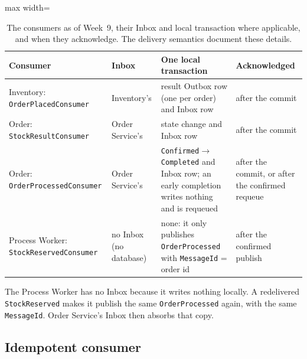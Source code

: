 \documentclass[a4paper]{report}
\begin{document}
\begin{table}[tbp]
\centering
\small
\begin{adjustbox}{max width=\linewidth}
\begin{tabular}{@{}>{\raggedright\arraybackslash}p{3.9cm}>{\raggedright\arraybackslash}p{2.2cm}>{\raggedright\arraybackslash}p{4.4cm}>{\raggedright\arraybackslash}p{3.1cm}@{}}
\toprule
Consumer & Inbox & One local transaction & Acknowledged \\
\midrule
Inventory: \texttt{OrderPlaced}\allowbreak\texttt{Consumer} & Inventory's & result Outbox row (one per order) and Inbox row & after the commit \\
Order: \texttt{StockResult}\allowbreak\texttt{Consumer} & Order Service's & state change and Inbox row & after the commit \\
Order: \texttt{OrderProcessed}\allowbreak\texttt{Consumer} & Order Service's & \texttt{Confirmed}$\to$\texttt{Completed} and Inbox row; an early completion writes nothing and is requeued & after the commit, or after the confirmed requeue \\
Process Worker: \texttt{StockReserved}\allowbreak\texttt{Consumer} & no Inbox (no database) & none: it only publishes \texttt{OrderProcessed} with \texttt{MessageId} = order id & after the confirmed publish \\
\bottomrule
\end{tabular}
\end{adjustbox}
\caption{The consumers as of Week~9, their Inbox and local transaction where
applicable, and when they acknowledge. The delivery semantics document these
details.}
\label{tab:consumers}
\end{table}

The Process Worker has no Inbox because it writes nothing locally. A
redelivered \texttt{StockReserved} makes it publish the same
\texttt{OrderProcessed} again, with the same \texttt{MessageId}. Order
Service's Inbox then absorbs that copy.

\subsection{Idempotent consumer}
\end{document}
